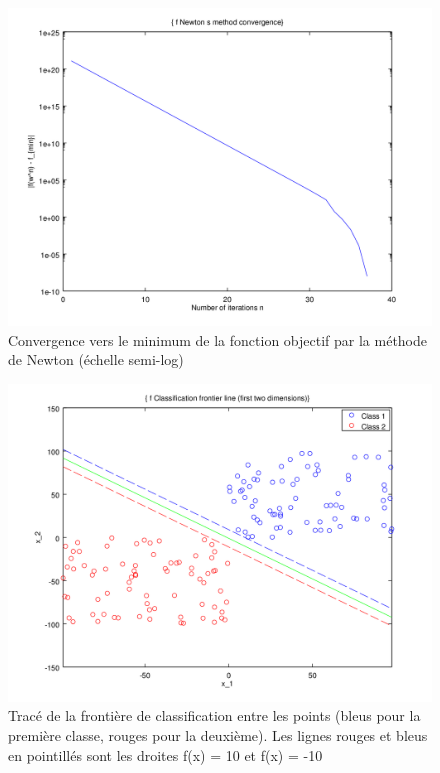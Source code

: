 \documentclass{article}
\begin{document}
         \begin{figure}
           \begin{center}
             \subfigure\includegraphics[scale=0.5]{images/cvnewton3.png}
             \caption{Convergence vers le minimum de la fonction objectif par la méthode de Newton (échelle semi-log)}
           \end{center}
         \end{figure}

         \begin{figure}
           \begin{center}
             \subfigure\includegraphics[scale=0.5]{images/line3.png}
             \caption{Tracé de la frontière de classification entre les points (bleus pour la première classe, rouges pour la deuxième). Les lignes rouges et bleus en pointillés sont les droites f(x) = 10 et f(x) = -10}
           \end{center}
         \end{figure}
\end{document}
